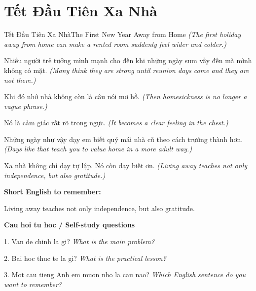\section{Tết Đầu Tiên Xa Nhà}
\begin{truyen}{Tết Đầu Tiên Xa Nhà}{The First New Year Away from Home}
\textit{(The first holiday away from home can make a rented room suddenly feel wider and colder.)}

Nhiều người trẻ tưởng mình mạnh cho đến khi những ngày sum vầy đến mà mình không có mặt.
\textit{(Many think they are strong until reunion days come and they are not there.)}

Khi đó nhớ nhà không còn là câu nói mơ hồ.
\textit{(Then homesickness is no longer a vague phrase.)}

Nó là cảm giác rất rõ trong ngực.
\textit{(It becomes a clear feeling in the chest.)}

Những ngày như vậy dạy em biết quý mái nhà cũ theo cách trưởng thành hơn.
\textit{(Days like that teach you to value home in a more adult way.)}

\end{truyen}

\begin{baihoc}
Xa nhà không chỉ dạy tự lập. Nó còn dạy biết ơn.
\textit{(Living away teaches not only independence, but also gratitude.)}
\end{baihoc}

\begin{ghinhoanh}
\textbf{Short English to remember:}

Living away teaches not only independence, but also gratitude.

\end{ghinhoanh}

\begin{tuhocnhanh}
\textbf{Cau hoi tu hoc / Self-study questions}

1. Van de chinh la gi? \textit{What is the main problem?}

2. Bai hoc thuc te la gi? \textit{What is the practical lesson?}

3. Mot cau tieng Anh em muon nho la cau nao? \textit{Which English sentence do you want to remember?}
\end{tuhocnhanh}
\ngancach

